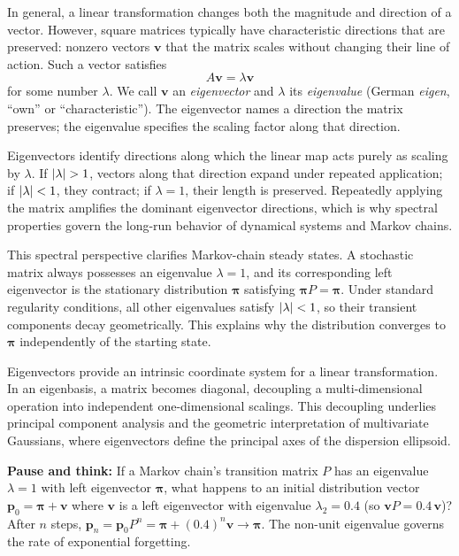 In general, a linear transformation changes both the magnitude and direction of a vector.
However, square matrices typically have characteristic directions that are preserved:
nonzero vectors $\mathbf{v}$ that the matrix scales without changing their line of action.
Such a vector satisfies
\[
  A\mathbf{v} = \lambda\mathbf{v}
\]
for some number $\lambda$. We call $\mathbf{v}$ an \emph{eigenvector} and $\lambda$ its
\emph{eigenvalue} (German \emph{eigen}, ``own'' or ``characteristic''). The eigenvector names a
direction the matrix preserves; the eigenvalue specifies the scaling factor along that direction.

\begin{intuitionbox}
Eigenvectors identify directions along which the linear map acts purely as scaling by $\lambda$.
If $\lvert\lambda\rvert>1$, vectors along that direction expand under repeated application; if
$\lvert\lambda\rvert<1$, they contract; if $\lambda=1$, their length is preserved. Repeatedly applying the
matrix amplifies the dominant eigenvector directions, which is why spectral properties govern the
long-run behavior of dynamical systems and Markov chains.
\end{intuitionbox}

This spectral perspective clarifies Markov-chain steady states. A stochastic matrix always possesses
an eigenvalue $\lambda=1$, and its corresponding left eigenvector is the stationary distribution
$\boldsymbol\pi$ satisfying $\boldsymbol\pi P=\boldsymbol\pi$. Under standard regularity conditions,
all other eigenvalues satisfy $\lvert\lambda\rvert<1$, so their transient components decay geometrically.
This explains why the distribution converges to $\boldsymbol\pi$ independently of the starting state.

\begin{aestheticbox}
Eigenvectors provide an intrinsic coordinate system for a linear transformation. In an eigenbasis,
a matrix becomes diagonal, decoupling a multi-dimensional operation into independent one-dimensional
scalings. This decoupling underlies principal component analysis and the geometric interpretation of
multivariate Gaussians, where eigenvectors define the principal axes of the dispersion ellipsoid.
\end{aestheticbox}

\begin{recoverybox}
\textbf{Pause and think:} If a Markov chain's transition matrix $P$ has an eigenvalue $\lambda = 1$ with left eigenvector $\boldsymbol\pi$, what happens to an initial distribution vector $\mathbf{p}_0 = \boldsymbol\pi + \mathbf{v}$ where $\mathbf{v}$ is a left eigenvector with eigenvalue $\lambda_2 = 0.4$ (so $\mathbf{v}P = 0.4\,\mathbf{v}$)? After $n$ steps, $\mathbf{p}_n = \mathbf{p}_0 P^n = \boldsymbol\pi + (0.4)^n \mathbf{v} \to \boldsymbol\pi$. The non-unit eigenvalue governs the rate of exponential forgetting.
\end{recoverybox}

